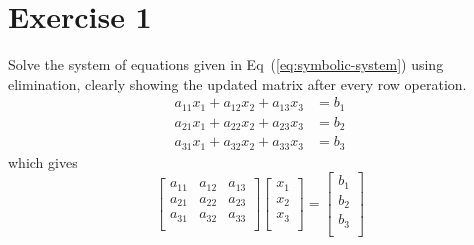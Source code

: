 \documentclass[12pt]{article}
\begin{document}
\section{Exercise 1}
Solve the system of equations given in Eq~(\ref{eq:symbolic-system}) using
elimination, clearly showing the updated matrix after every row operation. 
\begin{equation}
    \begin{aligned}
        a_{11} x_{1} + a_{12} x_{2} + a_{13} x_{3} & = b_{1}    \\ 
        a_{21} x_{1} + a_{22} x_{2} + a_{23} x_{3} & = b_{2}    \\
        a_{31} x_{1} + a_{32} x_{2} + a_{33} x_{3} & = b_{3} 
    \end{aligned}
    \label{eq:symbolic-system}
\end{equation}
which gives
\begin{equation}
    \begin{bmatrix}
        a_{11}      &   a_{12}      &   a_{13}              \\
        a_{21}      &   a_{22}      &   a_{23}              \\
        a_{31}      &   a_{32}      &   a_{33}              \\
    \end{bmatrix}
    \begin{bmatrix}
        x_{1}       \\
        x_{2}       \\
        x_{3}       \\
    \end{bmatrix}
    =
    \begin{bmatrix}
        b_{1}       \\
        b_{2}       \\
        b_{3}       \\
    \end{bmatrix}
\end{equation}
\end{document}
